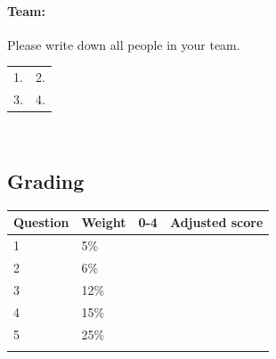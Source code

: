 \documentclass[a4paper,12pt]{book}
\begin{document}

    \newpage
    
    \paragraph{Team:}
    Please write down all people in your team. ~\\

    \begin{tabular}{ p{6cm} p{6cm} }
        1. & 2. \\
        3. & 4.
    \end{tabular}
    ~\\

    \hrulefill
    \subsection*{Grading}
            
    \begin{center}
        
        \begin{tabular}{ | l | l | l | l | }
            \hline
            \textbf{ Question } & \textbf{ Weight } & \textbf{ 0-4 } & \textbf{ Adjusted score }
            \\ \hline
            
            1 & 5\% & &    \\ \hline
            
            2 & 6\% & &    \\ \hline
            
            3 & 12\% & &    \\ \hline
            
            4 & 15\% & &    \\ \hline
            
            5 & 25\% & &    \\ \hline

            & & & \\ \hline
            
            
            
        \end{tabular}
    \end{center}
\end{document}
